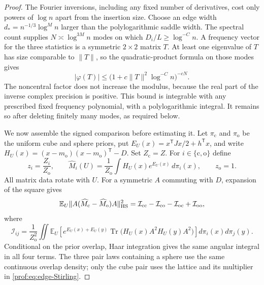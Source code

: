 \begin{proof}
The Fourier inversions, including any fixed number of derivatives, cost
only powers of $\log n$ apart from the insertion size. Choose an edge
width $d_*=n^{-1/3}\log^M n$ larger than the polylogarithmic saddle
width. The spectral count supplies $N\asymp\log^{3M}n$ modes on which
$D_i/L\ge\log^{-C}n$. A frequency vector for the three statistics is
a symmetric $2\times2$ matrix $T$. At least one eigenvalue of $T$ has
size comparable to $\|T\|$, so the quadratic-product formula on those
modes gives
\[
 |\varphi(T)|\le
 \bigl(1+c\|T\|^2\log^{-C}n\bigr)^{-cN}.
\]
The noncentral factor does not increase the modulus, because the real
part of the inverse complex precision is positive. This bound is
integrable with any prescribed fixed frequency polynomial, with a
polylogarithmic integral. It remains so after deleting finitely many
modes, as required below.

We now assemble the signed comparison before estimating it. Let
$\pi_{\mathrm c}$ and $\pi_{\mathrm o}$ be the uniform cube and sphere
priors, put $E_U(x)=x^{\mathsf T}Jx/2+h^{\mathsf T}x$, and write
$H_U(x)=(x-m_{\mathrm o})(x-m_{\mathrm o})^{\mathsf T}-D$.
Set $Z_{\mathrm c}=Z$. For $i\in\{\mathrm c,\mathrm o\}$ define
\[
 z_i=\frac{Z_i}{Z_{\mathrm o}},\qquad
 \widehat M_i(U)=\frac1{Z_{\mathrm o}}
       \int H_U(x)e^{E_U(x)}\,d\pi_i(x),\qquad z_{\mathrm o}=1.
\]
All matrix data rotate with $U$. For a symmetric $A$ commuting with
$D$, expansion of the square gives
\[
 \mathbb E_U\|A(\widehat M_{\mathrm c}-\widehat M_{\mathrm o})A\|_{\rm HS}^2
 =\mathcal I_{\mathrm{cc}}-\mathcal I_{\mathrm{co}}
  -\mathcal I_{\mathrm{oc}}+\mathcal I_{\mathrm{oo}},
\]
where
\[
 \mathcal I_{ij}=\frac1{Z_{\mathrm o}^2}
 \iint\mathbb E_U\!\left[e^{E_U(x)+E_U(y)}
       \operatorname{Tr}\bigl(H_U(x)A^2H_U(y)A^2\bigr)\right]
       d\pi_i(x)d\pi_j(y).
\]
Conditional on the prior overlap, Haar integration gives the same
angular integral in all four terms. The three pair laws containing a
sphere use the same continuous overlap density; only the cube pair
uses the lattice and its multiplier in \eqref{prof:eq:edge-Stirling}.


\end{proof}
